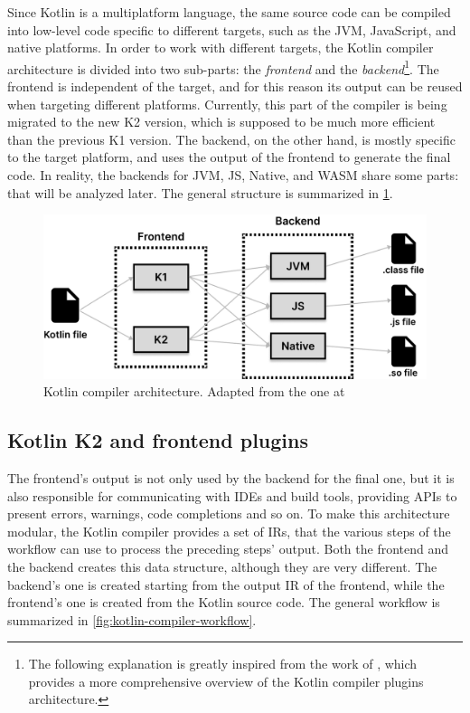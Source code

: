\documentclass[12pt,a4paper,openright,twoside]{book}
\begin{document}
Since Kotlin is a multiplatform language, the same source code can be compiled
into low-level code specific to different targets, such as the JVM, JavaScript,
and native platforms. In order to work with different targets, the Kotlin
compiler architecture is divided into two sub-parts: the \emph{frontend} and the
\emph{backend}\footnote{The following explanation is greatly
inspired from the work of \cite{moskala2023}, which provides a more
comprehensive overview of the Kotlin compiler plugins architecture.}.
%
The frontend is independent of the target, and for this reason its output can be 
reused when targeting different platforms. Currently, this part of the compiler 
is being migrated to the new K2 version, which is supposed to be much more 
efficient than the previous K1 version.
%
The backend, on the other hand, is mostly specific to the target platform, and
uses the output of the frontend to generate the final code. In reality, the
backends for JVM, JS, Native, and WASM share some parts: that will be analyzed
later. The general structure is summarized in
\cref{fig:kotlin-compiler-architecture}.

\begin{figure}
  \centering
  \includegraphics[width=.8\linewidth]{figures/kotlin-compiler-architecture.pdf}
  \caption{Kotlin compiler architecture. Adapted from the one at \cite{moskala2023}}
  \label{fig:kotlin-compiler-architecture}
\end{figure}

\subsection{Kotlin K2 and frontend plugins}

The frontend's output is not only used by the backend for the final one, but it
is also responsible for communicating with \acp{IDE} and build tools, providing
APIs to present errors, warnings, code completions and so on. 
%
To make this architecture modular, the Kotlin compiler provides a set of 
\acp{IR}, that the various steps of the workflow
can use to process the preceding steps' output. Both the frontend and the
backend creates this data structure, although they are very different. The 
backend's one is created starting from the output \ac{IR} of the frontend,
while the frontend's one is created from the Kotlin source code. 
The general workflow is summarized in \cref{fig:kotlin-compiler-workflow}.
\end{document}
